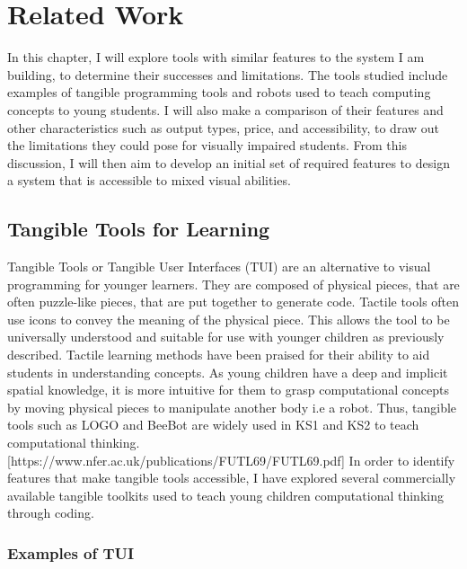 \documentclass[oneside,%
                    author={Malak Hajji},
                    degree={BSc},
                    title={Designing An Accessible Computational Toolkit For Students},
                  subtitle={With Mixed Visual Abilities}]{dissertation}
\begin{document}

\chapter{Related Work}
\label{chap:execution}
In this chapter, I will explore tools with similar features to the system I am building, to determine their successes and limitations. The tools studied include examples of tangible programming tools and robots used to teach computing concepts to young students. I will also make a comparison of their features and other characteristics such as output types, price, and accessibility, to draw out the limitations they could pose for visually impaired students. From this discussion, I will then aim to develop an initial set of required features to design a system that is accessible to mixed visual abilities.

\section{Tangible Tools for Learning}

Tangible Tools or Tangible User Interfaces (TUI) are an alternative to visual programming for younger learners. They are composed of physical pieces, that are often puzzle-like pieces, that are put together to generate code. Tactile tools often use icons to convey the meaning of the physical piece. This allows the tool to be universally understood and suitable for use with younger children as previously described. Tactile learning methods have been praised for their ability to aid students in understanding concepts. As young children have a deep and implicit spatial knowledge, it is more intuitive for them to grasp computational concepts by moving physical pieces to manipulate another body i.e a robot. Thus, tangible tools such as LOGO and BeeBot are widely used in KS1 and KS2 to teach computational thinking. [https://www.nfer.ac.uk/publications/FUTL69/FUTL69.pdf]
In order to identify features that make tangible tools accessible, I have explored several commercially available tangible toolkits used to teach young children computational thinking through coding.

\subsection{Examples of TUI}
\end{document}

